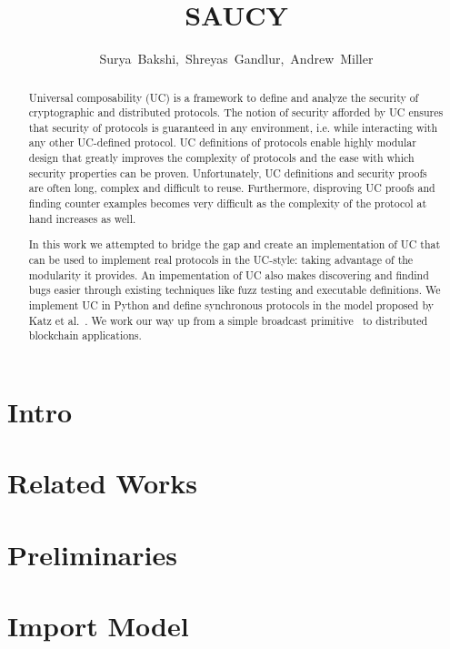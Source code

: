 \documentclass[11pt]{article}
\title{\bf SAUCY}
\author{\mbox{Surya Bakshi, Shreyas Gandlur, Andrew Miller}}
\begin{document}
\pagestyle{fancy}

\maketitle

\begin{abstract}
Universal composability (UC) is a framework to define and analyze the security of cryptographic and distributed protocols.
The notion of security afforded by UC ensures that security of protocols is guaranteed in any environment, i.e. while interacting with any other UC-defined protocol. 
UC definitions of protocols enable highly modular design that greatly improves the complexity of protocols and the ease with which security properties can be proven.
Unfortunately, UC definitions and security proofs are often long, complex and difficult to reuse. 
Furthermore, disproving UC proofs and finding counter examples becomes very difficult as the complexity of the protocol at hand increases as well.

In this work we attempted to bridge the gap and create an implementation of UC that can be used to implement real protocols in the UC-style: taking advantage of the modularity it provides.
An impementation of UC also makes discovering and findind bugs easier through existing techniques like fuzz testing and executable definitions.
We implement UC in Python and define synchronous protocols in the model proposed by Katz et al.~\cite{katz-clock}. 
We work our way up from a simple broadcast primitive~\cite{bracha-broadcast} to distributed blockchain applications.
\end{abstract}

\section{Intro}

\section{Related Works}


\section{Preliminaries}


\section{Import Model}

\end{document}
